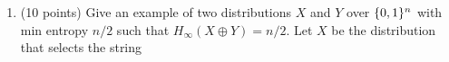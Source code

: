\documentclass{article}
\begin{document}
\begin{enumerate}[,start=6]
\begin{enumerate}[noitemsep,topsep=\mdcompacttopsep,label=\alph*.]
\item{}
(10 points) Give an example of two distributions $X$ and $Y$ over $\{0,1\}^n$ with min entropy $n/2$ such that $H_{\infty}(X\oplus Y)=n/2$.%
Let $X$ be the distribution that selects the string%
\end{enumerate}%
\end{enumerate}%
\end{document}

